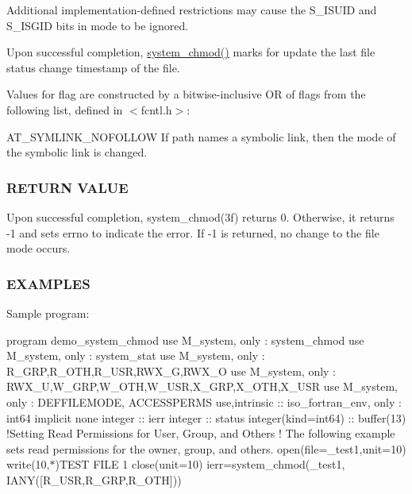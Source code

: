 Additional implementation-\/defined restrictions may cause the S\+\_\+\+I\+S\+U\+ID and S\+\_\+\+I\+S\+G\+ID bits in mode to be ignored.

Upon successful completion, \mbox{\hyperlink{namespacem__system_ace9ce0c8a9c8341a76b8903cd2390ce3}{system\+\_\+chmod()}} marks for update the last file status change timestamp of the file.

Values for flag are constructed by a bitwise-\/inclusive OR of flags from the following list, defined in $<$fcntl.\+h$>$\+:

A\+T\+\_\+\+S\+Y\+M\+L\+I\+N\+K\+\_\+\+N\+O\+F\+O\+L\+L\+OW If path names a symbolic link, then the mode of the symbolic link is changed.

\subsubsection*{R\+E\+T\+U\+RN V\+A\+L\+UE}

Upon successful completion, system\+\_\+chmod(3f) returns 0. Otherwise, it returns -\/1 and sets errno to indicate the error. If -\/1 is returned, no change to the file mode occurs.

\subsubsection*{E\+X\+A\+M\+P\+L\+ES}

Sample program\+:

program demo\+\_\+system\+\_\+chmod use M\+\_\+system, only \+: system\+\_\+chmod use M\+\_\+system, only \+: system\+\_\+stat use M\+\_\+system, only \+: R\+\_\+\+G\+RP,R\+\_\+\+O\+TH,R\+\_\+\+U\+SR,R\+W\+X\+\_\+G,R\+W\+X\+\_\+O use M\+\_\+system, only \+: R\+W\+X\+\_\+U,W\+\_\+\+G\+RP,W\+\_\+\+O\+TH,W\+\_\+\+U\+SR,X\+\_\+\+G\+RP,X\+\_\+\+O\+TH,X\+\_\+\+U\+SR use M\+\_\+system, only \+: D\+E\+F\+F\+I\+L\+E\+M\+O\+DE, A\+C\+C\+E\+S\+S\+P\+E\+R\+MS use,intrinsic \+:\+: iso\+\_\+fortran\+\_\+env, only \+: int64 implicit none integer \+:\+: ierr integer \+:\+: status integer(kind=int64) \+:\+: buffer(13) !\+Setting Read Permissions for User, Group, and Others ! The following example sets read permissions for the owner, group, and others. open(file=\textquotesingle{}\+\_\+test1\textquotesingle{},unit=10) write(10,$\ast$)\textquotesingle{}T\+E\+ST F\+I\+LE 1\textquotesingle{} close(unit=10) ierr=system\+\_\+chmod(\textquotesingle{}\+\_\+test1\textquotesingle{}, I\+A\+N\+Y(\mbox{[}\+R\+\_\+\+U\+S\+R,\+R\+\_\+\+G\+R\+P,\+R\+\_\+\+O\+T\+H\mbox{]}))

